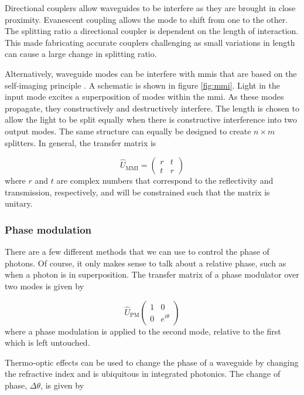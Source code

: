 Directional couplers allow waveguides to be interfere as they are brought in close proximity. Evanescent coupling allows the mode to shift from one to the other. The splitting ratio a directional coupler is dependent on the length of interaction. This made fabricating accurate couplers challenging as small variations in length can cause a large change in splitting ratio.

Alternatively, waveguide modes can be interfere with \acp{mmi} that are based on the self-imaging principle \cite{soldano1995optical}. A schematic is shown in figure \ref{fig:mmi}. Light in the input mode excites a superposition of modes within the \ac{mmi}. As these modes propagate, they constructively and destructively interfere. The length is chosen to allow the light to be split equally when there is constructive interference into two output modes. The same structure can equally be designed to create $n\times m$ splitters. In general, the transfer matrix is

\begin{equation}
	\hat{U}_\mathrm{MMI} = \left(
	\begin{matrix}
	r & t\\
	t & r
	\end{matrix}
	\right)
\end{equation}
where $r$ and $t$ are complex numbers that correspond to the reflectivity and transmission, respectively, and will be constrained such that the matrix is unitary.

\subsubsection*{Phase modulation}

There are a few different methods that we can use to control the phase of photons. Of course, it only makes sense to talk about a relative phase, such as when a photon is in superposition. The transfer matrix of a phase modulator over two modes is given by

\begin{equation}
	\hat{U}_\mathrm{PM}\left(
	\begin{matrix}
	1 & 0\\
	0 & e^{i\theta}
	\end{matrix}
	\right)
\end{equation}
where a phase modulation is applied to the second mode, relative to the first which is left untouched.

Thermo-optic effects can be used to change the phase of a waveguide by changing the refractive index and is ubiquitous in integrated photonics. The change of phase, $\Delta\theta$, is given by

